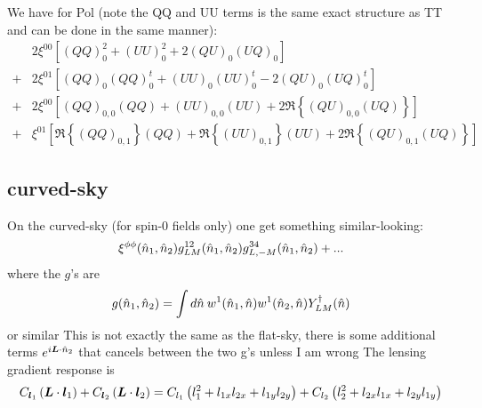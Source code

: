 \documentclass[11pt]{article}
\begin{document}
\newcommand{\real}[1]{ \Re {\left\{#1\right\}}}
We have for Pol (note the QQ and UU terms is the same exact structure as TT and can be done in the same manner):
\begin{equation}
\boxed{
\begin{split}
	&2 \xi^{00} \left[ \left(QQ\right)_0^2 + \left(UU\right)_0^2 + 2\left(QU\right)_0\left(UQ\right)_0 \right] \\+ &2 \xi^{01}\left[ \left(QQ\right)_0\left(QQ\right)^t_0  + \left(UU\right)_0\left(UU\right)^t_0-2\left(QU\right)_0\left(UQ\right)^t_0 \right] \\
	+& 2\xi^{00} \left[ (QQ)_{0,0}(QQ)  + (UU)_{0,0}(UU) + 2  \Re\left\{(QU)_{0,0}(UQ)\right\}\right] \\ +& \xi^{01} \left[ \real{(QQ)_{0,1}}(QQ)  + \real{(UU)_{0,1}}(UU) + 2  \real{(QU)_{0,1}(UQ)}\right]
\end{split}}
\end{equation}


\subsection{curved-sky}
On the curved-sky (for spin-0 fields only) one get something similar-looking:
\begin{equation}
\xi^{\phi\phi}({\hat n}_1,{\hat n}_2) g^{12}_{LM}({\hat n}_1,{\hat n}_2) g^{34}_{L,-M}({\hat n}_1,{\hat n}_2) + ...
\end{equation}
where the $g$'s are
\begin{equation}
	g({\hat n}_1, {\hat n}_2) = \int d{\hat n} \:w^1({\hat n}_1, {\hat n})w^1({\hat n}_2, {\hat n}) Y^\dagger_{LM}({\hat n})
\end{equation}
or similar
\color{red} This is not exactly the same as the flat-sky, there is some additional terms $e^{i \boldsymbol{L} \cdot {\hat n}_2}$ that cancels between the two g's unless I am wrong
\color{black}
The lensing gradient response is
\begin{equation}
	C_{\boldsymbol{l}_1} \left( \boldsymbol{L} \cdot \boldsymbol{l}_1 \right) + C_{\boldsymbol{l}_2} \left( \boldsymbol{L} \cdot \boldsymbol{l}_2 \right) = C_{l_1}\left( l_1^2  + l_{1x} l_{2x} + l_{1y} l_{2y}\right) + C_{l_2}\left( l_2^2  + l_{2x} l_{1x} + l_{2y} l_{1y}\right)
\end{equation}
\end{document}
